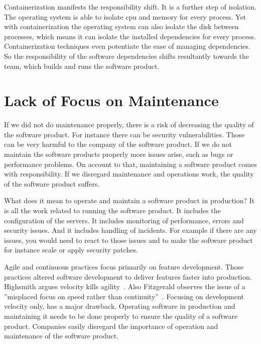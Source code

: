 Containerization manifests the responsibility shift. It is a further step of
isolation. The operating system is able to isolate cpu and memory for every process. Yet
with containerization the operating system can also isolate the disk between processes,
which means it can isolate the installed dependencies for every process. Containerization
techniques even potentiate the ease of managing dependencies. So the responsibility of the
software dependencies shifts resultantly towards the team, which builds and runs the
software product.


\section{Lack of Focus on Maintenance}

If we did not do maintenance properly, there is a risk of decreasing the quality of the
software product. For instance there can be security vulnerabilities. Those can be very
harmful to the company of the software product. If we do not maintain the software
products properly more issues arise, such as bugs or performance problems. On account to
that, maintaining a software product comes with responsibility. If we disregard
maintenance and operations work, the quality of the software product suffers.

What does it mean to operate and maintain a software product in production? It is all the
work related to running the software product. It includes the configuration of the
servers. It includes monitoring of performance, errors and security issues. And it
includes handling of incidents. For example if there are any issues, you would need to
react to those issues and to make the software product for instance scale or apply
security patches.

Agile and continuous practices focus primarily on feature development. Those practices
altered software development to deliver features faster into production. Highsmith argues
velocity kills agility~\cite{velocity_kills}. Also Fitzgerald observes the issue of a
”misplaced focus on speed rather than continuity”~\cite{continuous_fitzgerald}. Focusing
on development velocity only, has a major drawback. Operating software in production and
maintaining it needs to be done properly to ensure the quality of a software
product. Companies easily disregard the importance of operation and maintenance of the
software product.


